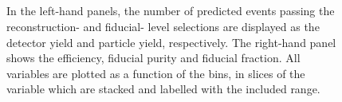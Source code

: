 \FloatBarrier
\clearpage


\begin{figure}[htb]
  \centering 
  \\
  \\
  \\
  \\
\caption{In the left-hand panels, the number of predicted events passing the reconstruction- and fiducial- level selections are displayed as the detector yield and particle yield, respectively. The right-hand panel shows the efficiency, fiducial purity and fiducial fraction. All variables are plotted as a function of the \dPhill bins, in slices of the \mFourL variable which are stacked and labelled with the included \mFourL range.
  \label{fig:dphiunf}}
 \end{figure}  
